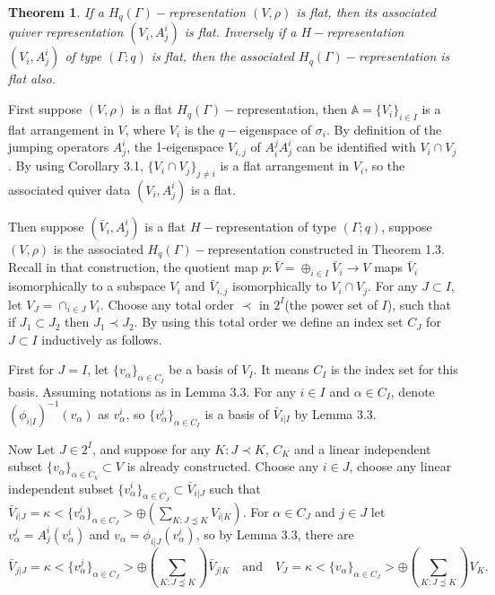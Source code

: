 \def\CTEXPreproc{Created by ctex v0.2.12, don't edit!}\documentclass[11pt]{article}
\newtheorem{thm}{Theorem}[section]
\begin{document}
\begin{thm}
If a $H_q (\Gamma )-$representation $(V,\rho )$ is flat,  then its associated quiver representation $(V_i , A^i _j   )$ is  flat.
Inversely if a $H-$representation $( V_i , A^i _j   )$ of type $(\Gamma;q)$ is flat, then the associated $H_q (\Gamma)-$representation  is flat also.
\end{thm}

\begin{pf}
First suppose $(V,\rho )$ is a flat $H_q (\Gamma )-$representation, then $\mathbb{A}=\{ V_i \}_{i\in I}$ is a flat arrangement in $V$, where $V_i $ is the $q-$eigenspace of $\sigma_i$. By definition of the jumping operators $A^i _j$, the 1-eigenspace  $V_{i,j}$ of $A^j _i A^i _j$ can be identified with $V_i \cap V_j$. By using Corollary 3.1, $\{  V_i \cap V_j \} _{j\neq i} $ is a flat arrangement in $V_i$, so the associated quiver data $(V_i , A^i _j   )$ is a flat.

Then suppose $(\bar{V}_i , A^i _j   )$ is a flat $H-$representation of type $(\Gamma ;q)$, suppose $(V, \rho)$ is the associated $H_q (\Gamma)-$representation constructed in Theorem 1.3. Recall in that construction, the quotient map $p : \bar{V}=\oplus_{i\in I} \bar{V}_i \rightarrow V$ maps $\bar{V}_i $ isomorphically to a subspace $V_i$ and $\bar{V}_{i,j}$ isomorphically to $V_i \cap V_j$. For any $J\subset I$, let $V_J = \cap_{i\in J} V_i$.
Choose any total order $\prec $ in $2^I$(the power set of $I$), such that if $ J_1 \subset J_2$ then $J_1 \prec J_2$. By using this total order we define an index set $C_J $ for $J\subset I$ inductively as follows.

First for $J=I$, let $ \{ v_{\alpha} \}_{\alpha \in C_{I}} $ be a basis of $V_I$. It means $C_I $ is the index set for this basis. Assuming notations as in Lemma 3.3. For any $i\in I$ and $\alpha\in C_I$, denote $( \phi_{i|I}  )^{-1} (v_{\alpha})  $ as $ v^i _{\alpha} $, so
$ \{ v^i _{\alpha} \}_{\alpha \in C_{I}}   $ is a basis of $\bar{V}_{i|I}$ by Lemma 3.3.

Now Let $J\in 2^I$, and suppose for any $K: J\prec K$, $C_{K}$ and a linear independent subset $\{  v_{\alpha} \}_{\alpha \in C_k} \subset V$ is already constructed. Choose any $i\in J$, choose any linear independent subset $\{ v^i _{\alpha} \}_{ \alpha \in C_J  }\subset  \bar{V}_{i|J}$ such that
$ \bar{V}_{i|J} = \kappa < \{ v^i _{\alpha} \}_{ \alpha \in C_J  }  > \oplus ( \sum_{K: J\precnsim K }   V_{i|K} ) $. For  $\alpha \in C_J$ and $j\in J$ let $v^j _{\alpha}= A^i _j ( v^i _{\alpha} )$ and $v_{\alpha}= \phi_{i|J}( v^i _{\alpha} )$,  so by Lemma 3.3, there are
\[
\bar{V}_{j|J}= \kappa <  \{ v^j _{\alpha} \}_{ \alpha \in C_J  }  >  \oplus ( \sum_{K: J\precnsim K }  ) \bar{V}_{j|K} \quad \text{and} \quad V_{J} = \kappa <  \{ v_{\alpha} \}_{ \alpha \in C_J  }  >  \oplus ( \sum_{K: J\precnsim K }  ) V_{K}   . \]


\end{pf}
\end{document}

